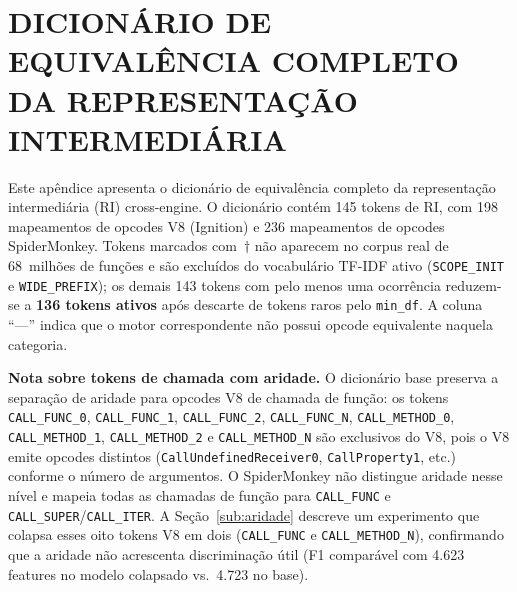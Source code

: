 \appendix

\chapter{DICIONÁRIO DE EQUIVALÊNCIA COMPLETO DA REPRESENTAÇÃO INTERMEDIÁRIA}
\label{ap:ir-dict}

Este apêndice apresenta o dicionário de equivalência completo da representação
intermediária (RI) cross-engine. O dicionário contém 145 tokens de RI, com 198
mapeamentos de opcodes V8 (Ignition) e 236 mapeamentos de opcodes SpiderMonkey.
Tokens marcados com~$\dagger$ não aparecem no corpus real de 68~milhões de funções
e são excluídos do vocabulário TF-IDF ativo (\texttt{SCOPE\_INIT} e
\texttt{WIDE\_PREFIX}); os demais 143 tokens com pelo menos uma ocorrência reduzem-se
a \textbf{136 tokens ativos} após descarte de tokens raros pelo \texttt{min\_df}.
A coluna ``---'' indica que o motor correspondente não possui opcode equivalente
naquela categoria.

\textbf{Nota sobre tokens de chamada com aridade.} O dicionário base preserva a
separação de aridade para opcodes V8 de chamada de função: os tokens
\texttt{CALL\_FUNC\_0}, \texttt{CALL\_FUNC\_1}, \texttt{CALL\_FUNC\_2},
\texttt{CALL\_FUNC\_N}, \texttt{CALL\_METHOD\_0}, \texttt{CALL\_METHOD\_1},
\texttt{CALL\_METHOD\_2} e \texttt{CALL\_METHOD\_N} são exclusivos do V8, pois o
V8 emite opcodes distintos (\texttt{CallUndefinedReceiver0}, \texttt{CallProperty1},
etc.) conforme o número de argumentos. O SpiderMonkey não distingue aridade nesse
nível e mapeia todas as chamadas de função para \texttt{CALL\_FUNC} e
\texttt{CALL\_SUPER}/\texttt{CALL\_ITER}. A Seção~\ref{sub:aridade} descreve um
experimento que colapsa esses oito tokens V8 em dois (\texttt{CALL\_FUNC} e
\texttt{CALL\_METHOD\_N}), confirmando que a aridade não acrescenta discriminação
útil (F1 comparável com 4.623 features no modelo colapsado vs.\ 4.723 no base).

